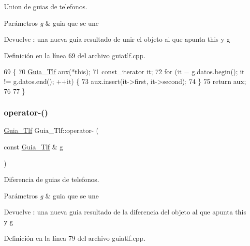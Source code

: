Union de guias de telefonos. 


\begin{DoxyParams}{Parámetros}
{\em g} & guia que se une \\
\hline
\end{DoxyParams}
\begin{DoxyReturn}{Devuelve}
\+: una nueva guia resultado de unir el objeto al que apunta this y g 
\end{DoxyReturn}


Definición en la línea 69 del archivo guiatlf.\+cpp.


\begin{DoxyCode}
69                                                \{
70     \hyperlink{classGuia__Tlf}{Guia\_Tlf} aux(*\textcolor{keyword}{this});
71     const\_iterator it;
72     \textcolor{keywordflow}{for} (it = g.datos.begin(); it != g.datos.end(); ++it) \{
73         aux.insert(it->first, it->second);
74     \}
75     \textcolor{keywordflow}{return} aux;
76 
77 \}
\end{DoxyCode}
\mbox{\label{classGuia__Tlf_ac381d53f275ce769830e07fbc56902b0}} 
\subsubsection{\texorpdfstring{operator-\/()}{operator-()}}
{\footnotesize\ttfamily \hyperlink{classGuia__Tlf}{Guia\+\_\+\+Tlf} Guia\+\_\+\+Tlf\+::operator-\/ (\begin{DoxyParamCaption}\item[{const \hyperlink{classGuia__Tlf}{Guia\+\_\+\+Tlf} \&}]{g }\end{DoxyParamCaption})}



Diferencia de guias de telefonos. 


\begin{DoxyParams}{Parámetros}
{\em g} & guia que se une \\
\hline
\end{DoxyParams}
\begin{DoxyReturn}{Devuelve}
\+: una nueva guia resultado de la diferencia del objeto al que apunta this y g 
\end{DoxyReturn}


Definición en la línea 79 del archivo guiatlf.\+cpp.


